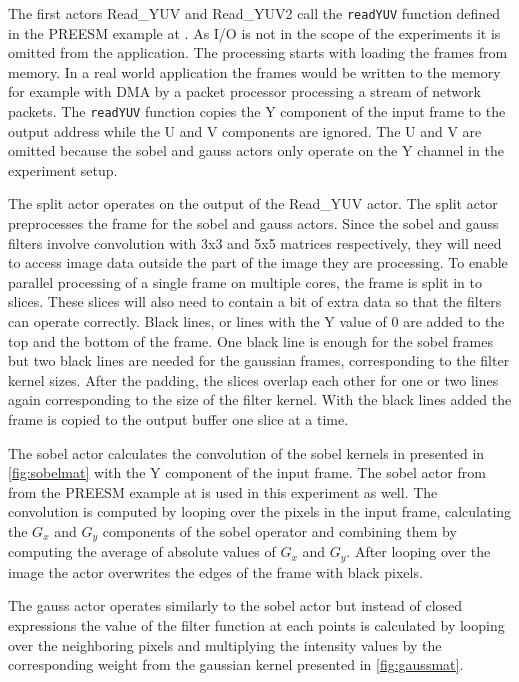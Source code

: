 The first actors Read\_YUV and Read\_YUV2 call the \texttt{readYUV} function defined in the PREESM example at \cite{preesmtut}. As I/O is not in the scope of the experiments it is omitted from the application. The processing starts with loading the frames from memory. In a real world application the frames would be written to the memory for example with DMA by a packet processor processing a stream of network packets. The \texttt{readYUV} function copies the Y component of the input frame to the output address while the U and V components are ignored. The U and V are omitted because the sobel and gauss actors only operate on the Y channel in the experiment setup.

The split actor operates on the output of the Read\_YUV actor. The split actor preprocesses the frame for the sobel and gauss actors. Since the sobel and gauss filters involve convolution with 3x3 and 5x5 matrices respectively, they will need to access image data outside the part of the image they are processing. To enable parallel processing of a single frame on multiple cores, the frame is split in to slices. These slices will also need to contain a bit of extra data so that the filters can operate correctly. Black lines, or lines with the Y value of 0 are added to the top and the bottom of the frame. One black line is enough for the sobel frames but two black lines are needed for the gaussian frames, corresponding to the filter kernel sizes. After the padding, the slices overlap each other for one or two lines again corresponding to the size of the filter kernel. With the black lines added the frame is copied to the output buffer one slice at a time. 

The sobel actor calculates the convolution of the sobel kernels in presented in \ref{fig:sobelmat} with the Y component of the input frame. The sobel actor from from the PREESM example at \cite{preesmtut} is used in this experiment as well. The convolution is computed by looping over the pixels in the input frame, calculating the $G_{x}$ and $G_{y}$ components of the sobel operator and combining them by computing the average of absolute values of $G_{x}$ and $G_{y}$. After looping over the image the actor overwrites the edges of the frame with black pixels.

The gauss actor operates similarly to the sobel actor but instead of closed expressions the value of the filter function at each points is calculated by looping over the neighboring pixels and multiplying the intensity values by the corresponding weight from the gaussian kernel presented in \ref{fig:gaussmat}.

